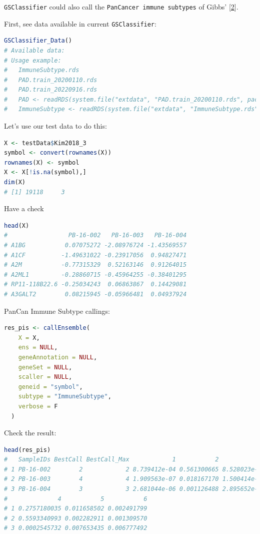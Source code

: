 \documentclass[
  12pt,
]{book}
\newcommand{\passthrough}[1]{#1}
\begin{document}
\passthrough{\lstinline!GSClassifier!} could also call the \passthrough{\lstinline!PanCancer immune subtypes!} of Gibbs' {[}\protect\hyperlink{ref-RN315}{2}{]}.

First, see data available in current \passthrough{\lstinline!GSClassifier!}:

\begin{lstlisting}[language=R]
GSClassifier_Data()
# Available data:
# Usage example:
#   ImmuneSubtype.rds 
#   PAD.train_20200110.rds 
#   PAD.train_20220916.rds 
#   PAD <- readRDS(system.file("extdata", "PAD.train_20200110.rds", package = "GSClassifier")) 
#   ImmuneSubtype <- readRDS(system.file("extdata", "ImmuneSubtype.rds", package = "GSClassifier"))
\end{lstlisting}

Let's use our test data to do this:

\begin{lstlisting}[language=R]
X <- testData$Kim2018_3
symbol <- convert(rownames(X))
rownames(X) <- symbol
X <- X[!is.na(symbol),]
dim(X)
# [1] 19118     3
\end{lstlisting}

Have a check

\begin{lstlisting}[language=R]
head(X)
#                 PB-16-002   PB-16-003   PB-16-004
# A1BG           0.07075272 -2.08976724 -1.43569557
# A1CF          -1.49631022 -0.23917056  0.94827471
# A2M           -0.77315329  0.52163146  0.91264015
# A2ML1         -0.28860715 -0.45964255 -0.38401295
# RP11-118B22.6 -0.25034243  0.06863867  0.14429081
# A3GALT2        0.08215945 -0.05966481  0.04937924
\end{lstlisting}

PanCan Immune Subtype callings:

\begin{lstlisting}[language=R]
res_pis <- callEnsemble(
    X = X,
    ens = NULL,
    geneAnnotation = NULL,
    geneSet = NULL,
    scaller = NULL,
    geneid = "symbol",
    subtype = "ImmuneSubtype",
    verbose = F
  )
\end{lstlisting}

Check the result:

\begin{lstlisting}[language=R]
head(res_pis)
#   SampleIDs BestCall BestCall_Max            1           2            3
# 1 PB-16-002        2            2 8.739412e-04 0.561300665 8.528023e-06
# 2 PB-16-003        4            4 1.909563e-07 0.018167170 1.500414e-04
# 3 PB-16-004        3            3 2.681044e-06 0.001126488 2.895652e-01
#              4           5           6
# 1 0.2757180035 0.011658502 0.002491799
# 2 0.5593340993 0.002282911 0.001309570
# 3 0.0002545732 0.007653435 0.006777492
\end{lstlisting}
\end{document}
